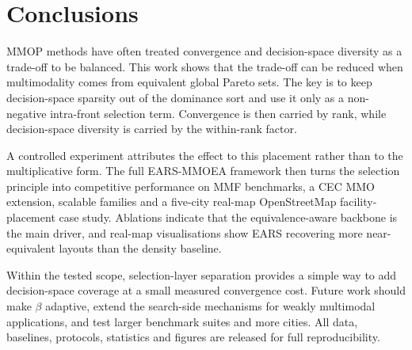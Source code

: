\section{Conclusions}
\label{sec:conclusion}
MMOP methods have often treated convergence and decision-space diversity as a trade-off to be
balanced. This work shows that the trade-off can be reduced when multimodality comes from
equivalent global Pareto sets. The key is to keep decision-space sparsity out of the dominance
sort and use it only as a non-negative intra-front selection term. Convergence is then carried by
rank, while decision-space diversity is carried by the within-rank factor.

A controlled experiment attributes the effect to this placement rather than to the multiplicative
form. The full EARS-MMOEA framework then turns the selection principle into competitive
performance on MMF benchmarks, a CEC MMO extension, scalable families and a five-city real-map OpenStreetMap
facility-placement case study. Ablations indicate that the equivalence-aware backbone is the main
driver, and real-map visualisations show EARS recovering more near-equivalent layouts than the
density baseline.

Within the tested scope, selection-layer separation provides a simple way to add decision-space
coverage at a small measured convergence cost. Future work should make $\beta$ adaptive, extend
the search-side mechanisms for weakly multimodal applications, and test larger benchmark suites
and more cities. All data, baselines, protocols, statistics and figures are released for full
reproducibility.

